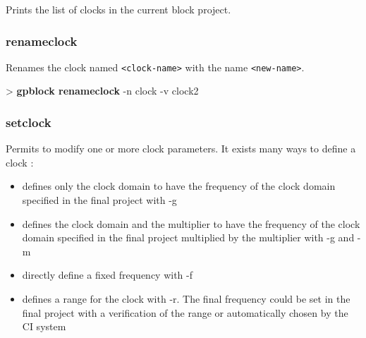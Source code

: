 \documentclass[10pt,a4paper]{article}
\begin{document}
Prints the list of clocks in the current block project.

\subsubsection{renameclock}

Renames the clock named \texttt{<clock-name>} with the name \texttt{<new-name>}.


\begin{sampletitle}
> \textbf{gpblock renameclock} -n clock -v clock2
\end{sampletitle}


\subsubsection{setclock}

Permits to modify one or more clock parameters. It exists many ways to define a clock :
\begin{itemize}
\item defines only the clock domain to have the frequency of the clock domain specified in the final project with -g
\item defines the clock domain and the multiplier to have the frequency of the clock domain specified in the final project multiplied by the multiplier with -g and -m
\item directly define a fixed frequency with -f
\item defines a range for the clock with -r. The final frequency could be set in the final project with a verification of the range or automatically chosen by the CI system
\end{itemize}

\end{document}
